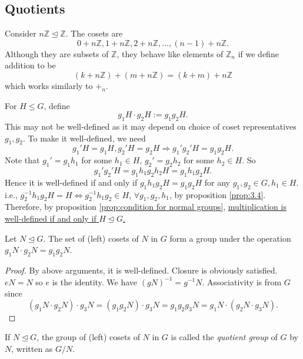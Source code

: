 \documentclass[10pt]{article}
\def\le{\leqslant}
\def\ltrigeq{\trianglelefteq}
\begin{document}
    \subsection{Quotients}
    Consider $ n \mathbb{Z} \ltrigeq \mathbb{Z} $. The cosets are 
    \[
        0+n \mathbb{Z}, 1+n \mathbb{Z} , 2+n \mathbb{Z} , \dots, (n-1)+n \mathbb{Z} 
    .\]
    Although they are subsets of $ \mathbb{Z} $, they behave like elements of $ \mathbb{Z}_n $ if we define addition to be 
    \[
        (k+n \mathbb{Z} )+(m+n \mathbb{Z} )=(k+m)+n \mathbb{Z}
    \]
    which works similarly to $ +_n $.

    For $ H\le G $, define 
    \[
        g_1H\cdot g_2H:= g_1g_2H
    .\]
    This may not be well-defined as it may depend on choice of coset representatives $g_1,g_2$.
    To make it well-defined, we need 
    \[
        g_1'H=g_1H, g_2'H=g_2H \Longrightarrow g_1'g_2'H=g_1g_2H
    .\]
    Note that $ g_1'=g_1h_1 $ for some $h_1\in H$, $ g_2'=g_2h_2 $ for some $h_2\in H$. So 
    \[
        g_1'g_2'H=g_1h_1g_2h_2H=g_1h_1g_2H
    .\]
    Hence it is well-defined if and only if $  g_1h_1g_2H=g_1g_2H $ for any $ g_1,g_2\in G, h_1\in H $. i.e., $ g_2^{-1}h_1g_2H=H \Leftrightarrow g_2^{-1}h_1g_2\in H $, $ \forall g_1,g_2,h_1 $, by proposition \ref{prop:3.4}. Therefore, by proposition \ref{prop:condition for normal groups}, \underline{multiplication is well-defined if and only if $ H\ltrigeq G $.}
    \begin{proposition}\label{prop:set of one-sided cosets form a group}
        Let $ N\ltrigeq G $. The set of (left) cosets of $N$ in $G$ form a group under the operation $ g_1N\cdot g_2N=g_1g_2 N $.
    \end{proposition}
    \begin{proof}
        By above arguments, it is well-defined. Closure is obviously satisfied. $eN=N$ so $e$ is the identity. We have $ (gN)^{-1}=g^{-1}N $. Associativity is from $G$ since
        \[
            (g_1N\cdot g_2N)\cdot g_3N=(g_1g_2N)\cdot g_3N=g_1g_2g_3N=g_1N\cdot(g_2N\cdot g_3N)
        .\]
    \end{proof}
    \begin{definition}
        If $ N \ltrigeq G $, the group of (left) cosets of $N$ in $G$ is called the \textit{quotient group} of $G$ by $N$, written as $ G/N $. 
    \end{definition}
\end{document}
